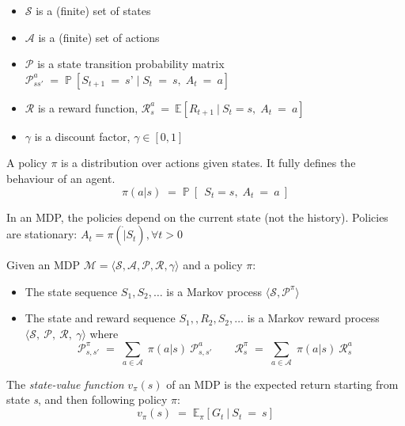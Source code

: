 \documentclass[10pt]{article}
\begin{document}
\begin{itemize}
\item $\mathcal{S}$ is a (finite) set of states
\item $\mathcal{A}$ is a (finite) set of actions
\item $\mathcal{P}$ is a state transition probability matrix \newline
$\mathcal{P}_{ss'}^{a} \; = \; \mathbb{P}\:[S_{t+1}\:=\:\textit{s'}\; | \; S_{t}\:=\:\textit{s}, \; A_{t}\:=\:\textit{a}]$
\item $\mathcal{R}$ is a reward function, $\mathcal{R}_{s}^{a}  \: = \: \mathbb{E}[R_{t+1} \: | \: S_{t} = s, \; A_{t}\:=\:\textit{a}]$
\item $\gamma$ is a discount factor, $\gamma \in [0,1]$
\end{itemize}

A policy $\pi$ is a distribution over actions given states. It fully defines the behaviour of an agent.
\begin{equation}
\pi(a|s) \; = \; \mathbb{P}\:[\:\: S_{t} = s, \; A_{t}\:=\:\textit{a}\:]
\end{equation}

In an MDP, the policies depend on the current state (not the history). Policies are stationary: $A_{t} = \pi ( \dot | S_{t} ), \forall t > 0$ \newline

Given an MDP $\mathcal{M} = \langle \mathcal{S, A, P, R,} \gamma \rangle$ and a policy $\pi$:
\begin{itemize}
\item The state sequence $S_{1}, S_{2}, \ldots$ is a Markov process $\langle \mathcal{S, P^{\pi}} \rangle$
\item The state and reward sequence $S_{1}, ,R_{2}, S_{2}, \ldots$ is a Markov reward process $\langle \mathcal{S}, \: \mathcal{P}, \: \mathcal{R}, \: \gamma \rangle$ where
\begin{equation}
\mathcal{P}_{s,s'}^{\pi} \; = \; \sum_{a \in \mathcal{A}} \; \pi (a|s)\: \mathcal{P}_{s,s'}^{a} \qquad
\mathcal{R}_{s}^{\pi} \; = \; \sum_{a \in \mathcal{A}} \; \pi (a|s)\: \mathcal{R}_{s}^{a} 
\end{equation}
\end{itemize}

The \textit{state-value function} $v_{\pi}(s)$ of an MDP is the expected return starting from state \textit{s}, and then following policy $\pi$:
\begin{equation}
v_{\pi}(s) \; = \; \mathbb{E}_{\pi} [ G_{t} \: | \: S_{t} \: = \: s] 
\end{equation}
\end{document}
